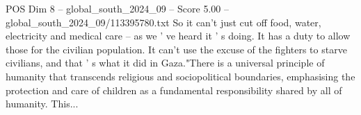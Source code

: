 \begin{textsample}{POS Dim 8 – global\_south\_2024\_09 – Score 5.00 – global\_south\_2024\_09/113395780.txt}
So it can't just cut off food, water, electricity and medical care -- as we ' ve heard it ' s doing.
It has a duty to allow those for the civilian population.
It can't use the excuse of the fighters to starve civilians, and that ' s what it did in Gaza."There is a universal principle of humanity that transcends religious and sociopolitical boundaries, emphasising the protection and care of children as a fundamental responsibility shared by all of humanity.
This...

\end{textsample}

